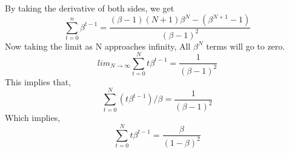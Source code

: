 \documentclass[letterpaper,12pt]{article}
\theoremstyle{definition}
\begin{document}
\\
By taking the derivative of both sides, we get
\[
    \sum^n _{t=0} \beta^{t-1} = \frac{(\beta-1)(N+1)\beta^N - (\beta^{N+1} -1)}{(\beta -1 )^2}
\]
Now taking the limit as N approaches infinity, All $\beta^N$ terms will go to zero.
\[
    lim_{N \to \infty} \sum^N_{t=0} t\beta^{t-1} = \frac{1}{(\beta -1)^2}
\]
This implies that,
\[
    \sum^N_{t=0} (t\beta^{t-1})/\beta = \frac{1}{(\beta -1)^2}
\]
Which implies,
\[
    \sum^N_{t=0} t\beta^{t-1} = \frac{\beta}{(1 - \beta)^2}
\]
\end{document}

